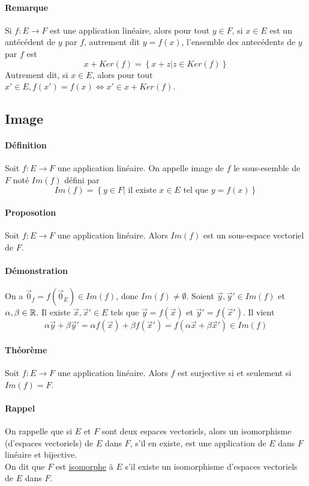 \paragraph{Remarque} Si $f: E \rightarrow F$ est une application linéaire, alors pour tout $y \in F$, si $x \in E$ est un antécédent de $y$ par $f$, autrement dit $y = f(x)$, l'ensemble des antecédents de $y$ par $f$ est
$$x + Ker(f) = \left\{ x+z \vert z \in Ker(f) \right\}$$
Autrement dit, si $x \in E$, alors pour tout $x' \in E, f(x') = f(x) \Leftrightarrow x' \in x + Ker(f)$.

%
\subsection{Image}
%
\paragraph{Définition} Soit $f: E \rightarrow F$ une application linéaire. On appelle image de $f$ le sous-esemble de $F$ noté $Im(f)$ défini par
$$Im(f) = \left\{ y \in F \vert \text{ il existe } x \in E \text{ tel que } y = f(x) \right\}$$

\paragraph{Proposotion} Soit $f: E \rightarrow F$ une application linéaire. Alors $Im(f)$ est un sous-espace vectoriel de $F$.
\paragraph{Démonstration} On a $\vec{0}_f = f(\vec{0}_E) \in Im(f)$, donc $Im(f) \neq \emptyset$. Soient $\vec{y}, \vec{y}' \in Im(f)$ et $\alpha, \beta \in \mathbb{R}$. Il existe $\vec{x}, \vec{x}' \in E$ tels que $\vec{y} = f(\vec{x})$ et $\vec{y}' = f(\vec{x}')$. Il vient
$$\alpha \vec{y} + \beta \vec{y}' = \alpha f(\vec{x}) + \beta f(\vec{x}') = f(\alpha \vec{x} + \beta \vec{x}') \in Im(f)$$

\paragraph{Théorème} Soit $f: E \rightarrow F$  une application linéaire. Alors $f$ est surjective si et seulement si $Im(f) = F$.

\paragraph{Rappel} On rappelle que si $E$ et $F$ sont deux espaces vectoriels, alors un isomorphisme (d'espaces vectoriels) de $E$ dans $F$, s'il en existe, est une application de $E$ dans $F$ linéaire et bijective. \\
On dit que $F$ est \underline{isomorphe} à $E$ s'il existe un isomorphisme d'espaces vectoriels de $E$ dans $F$.

